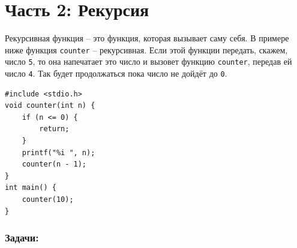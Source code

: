 \documentclass{article}
\begin{document}
\section*{Часть 2: Рекурсия}
Рекурсивная функция -- это функция, которая вызывает саму себя.  В примере ниже функция \texttt{counter} -- рекурсивная. Если этой функции передать, скажем, число \texttt{5}, то она напечатает это число и вызовет функцию \texttt{counter}, передав ей число \texttt{4}. Так будет продолжаться пока число не дойдёт до \texttt{0}.
\begin{lstlisting}
#include <stdio.h>
void counter(int n) {
    if (n <= 0) {
        return;
    }
    printf("%i ", n);
    counter(n - 1);
}
int main() {
    counter(10);
}
\end{lstlisting}

\subsubsection*{Задачи:}
\end{document}
